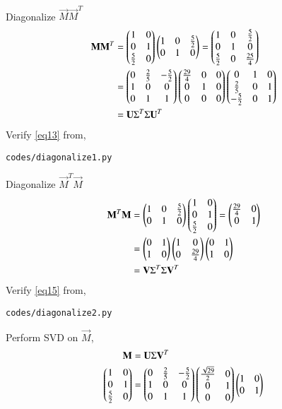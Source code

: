 \documentclass[journal,12pt,twocolumn]{IEEEtran}
\begin{document}
\\
Diagonalize $\vec{M}\vec{M}^T$
\begin{align}
	\label{eq12}\mathbf{M}\mathbf{M}^T &= \begin{pmatrix}1 & 0\\0 & 1\\\frac{5}{2} & 0\end{pmatrix}\begin{pmatrix}1 & 0 & \frac{5}{2}\\0 & 1 & 0\end{pmatrix} = \begin{pmatrix}1 & 0 & \frac{5}{2}\\0 & 1 & 0\\\frac{5}{2} & 0 & \frac{25}{4}\end{pmatrix}\\
	\label{eq13}&= \begin{pmatrix}0 & \frac{2}{5} & -\frac{5}{2}\\1 & 0 & 0\\0 & 1 & 1\end{pmatrix}\begin{pmatrix}\frac{29}{4} & 0 & 0\\0 & 1 & 0\\0 & 0 & 0\end{pmatrix}\begin{pmatrix}0 & 1 & 0\\\frac{2}{5} & 0 & 1\\-\frac{5}{2} & 0 & 1\end{pmatrix}\\
	&= \mathbf{U}\Sigma^T\Sigma\mathbf{U}^T
\end{align}
Verify \eqref{eq13} from,
\begin{lstlisting}
codes/diagonalize1.py
\end{lstlisting}
Diagonalize $\vec{M}^T\vec{M}$
\begin{align}
	\label{e14}\mathbf{M}^T\mathbf{M} &= \begin{pmatrix}1 & 0 & \frac{5}{2}\\0 & 1 & 0\end{pmatrix}\begin{pmatrix}1 & 0\\0 & 1\\\frac{5}{2} & 0\end{pmatrix} = \begin{pmatrix}\frac{29}{4} & 0\\0 & 1\end{pmatrix}\\
	\label{eq15}&= \begin{pmatrix}0 & 1\\1 & 0\end{pmatrix}\begin{pmatrix}1 & 0\\0 & \frac{29}{4}\end{pmatrix}\begin{pmatrix}0 & 1\\1 & 0\end{pmatrix}\\
	&= \mathbf{V}\Sigma^T\Sigma\mathbf{V}^T
\end{align}
Verify \eqref{eq15} from,
\begin{lstlisting}
codes/diagonalize2.py
\end{lstlisting}
Perform SVD on $\vec{M}$,
\begin{align}
	\label{eq16}\mathbf{M} &= \mathbf{U}\Sigma\mathbf{V}^T\\
	\label{eq17}\begin{pmatrix}1 & 0\\0 & 1\\\frac{5}{2} & 0\end{pmatrix} &= \begin{pmatrix}0 & \frac{2}{5} & -\frac{5}{2}\\1 & 0 & 0\\0 & 1 & 1\end{pmatrix}\begin{pmatrix}\frac{\sqrt{29}}{2} & 0 \\0 & 1\\0 & 0\end{pmatrix} \begin{pmatrix}1 & 0\\0 & 1\end{pmatrix}
\end{align}
\end{document}
